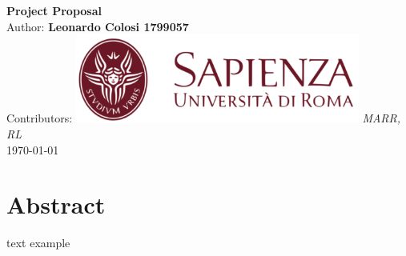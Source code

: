\documentclass[10pt,a4paper]{article}
\begin{document}
\begin{titlepage}
    \begin{center}
        \vspace*{1cm}
        \Huge\textbf{Project Proposal}\\
        \vspace{1.5cm}
        \Large Author:
        \textbf{Leonardo Colosi 1799057}\\
        \vspace{0.5cm}
        \Large Contributors: \textbf{}
        \vfill
        \includegraphics[width=0.7\textwidth]{images/sapienza_logo.png}
        \vfill
        \vspace{0.8cm}
        \Large \textit{MARR, RL}\\
        \today
    \end{center}
\end{titlepage}
\newpage

\section{Abstract}
text example \cite{peng2020learning}

\printbibliography
\end{document}
